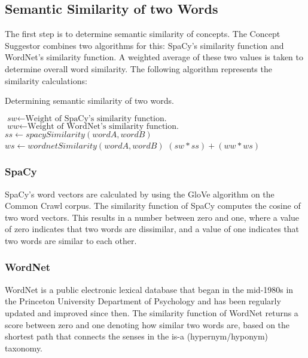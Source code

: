 \documentclass{article}
\begin{document}
\subsection{Semantic Similarity of two Words}

The first step is to determine semantic similarity of concepts. The Concept Suggestor combines two algorithms for this: SpaCy's similarity function and WordNet's similarity function. A weighted average of these two values is taken to determine overall word similarity. The following algorithm represents the similarity calculations: %
\begin{algorithm}
\caption{Determining semantic similarity of two words.}\label{al:semanticsimilarity}
\begin{algorithmic}[1]
		\State $\textit{sw} \gets \text{Weight of SpaCy's similarity function.}$
		\State $\textit{ww} \gets \text{Weight of WordNet's similarity function.}$
		\State $\textit{ss} \gets \textit{spacySimilarity}(wordA, wordB)$
		\State $\textit{ws} \gets \textit{wordnetSimilarity}(wordA, wordB)$
		\State \Return $(sw*ss)+(ww*ws)$
	\EndProcedure
\end{algorithmic}
\end{algorithm}

\subsubsection{SpaCy}
SpaCy's word vectors are calculated by using the GloVe algorithm on the Common Crawl corpus. The similarity function of SpaCy computes the cosine of two word vectors. This results in a number between zero and one, where a value of zero indicates that two words are dissimilar, and a value of one indicates that two words are similar to each other. %

\subsubsection{WordNet}
WordNet is a public electronic lexical database that began in the mid-1980s in the Princeton University Department of Psychology and has been regularly updated and improved since then. The similarity function of WordNet returns a score between zero and one denoting how similar two words are, based on the shortest path that connects the senses in the is-a (hypernym/hyponym) taxonomy. %
\end{document}
